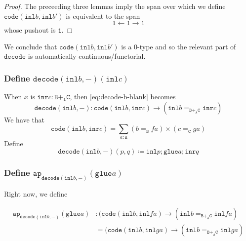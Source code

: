 \documentclass[12pt]{amsart}
\newcommand{\from}{\colon}
\newcommand{\type}[1]{\mathtt{#1}}
\newcommand{\tin}{\colon}
\newcommand{\A}{\type{A}}
\newcommand{\B}{\type{B}}
\newcommand{\C}{\type{C}}
\newcommand{\BAC}{\B +_{\A} \C}
\newcommand{\ap}{\type{ap}}
\newcommand{\inl}{\type{inl}}
\newcommand{\inr}{\type{inr}}
\newcommand{\glue}{\type{glue}}
\newcommand{\code}{\type{code}}
\newcommand{\decode}{\type{decode}}
\theoremstyle{remark}
\theoremstyle{definition}
\begin{document}
\begin{proof}
  The preceeding three lemmas imply the span over which we define \(
  \code ( \inl b , \inl b' ) \) is equivalent to the span
  \[
    \type{1} \gets \type{1} \to \type{1}
  \]
  whose pushout is \( \type{1} \).
\end{proof}

We conclude that \( \code ( \inl b , \inl b' ) \) is a 0-type and so
the relevant part of \( \decode \) is automatically continuous/functorial.

\subsubsection{Define \( \decode ( \inl b , - ) ( \inl c ) \)} %

When \( x \) is \( \inr c \tin \BAC \), then \eqref{eq:decode-b-blank} becomes
\[
  \decode ( \inl b , - )
  \from
  \code ( \inl b , \inr c )
  \to
  ( \inl b =_{\BAC} \inr c )
\]
We have that
\[
  \code ( \inl b , \inr c )
  =
  \sum\limits_{a \tin \A} (b =_{\B} fa) \times (c =_{\C} ga)
\]
Define
\[
  \decode ( \inl b , - ) ( p , q )
  \coloneqq
  \inl p ; \glue a ; \inr q
\]

\subsubsection{ Define \( \ap_{\decode ( \inl b , - )} (\glue a) \) } %

Right now, we define

\begin{align*}
  \ap_{\decode ( \inl b , - )} (\glue a) &
  \tin
  ( \code ( \inl b , \inl fa ) \to ( \inl b =_{\BAC} \inl fa ) \\
  & =
  ( \code ( \inl b , \inl ga ) \to ( \inl b =_{\BAC} \inl ga )
\end{align*}
\end{document}
